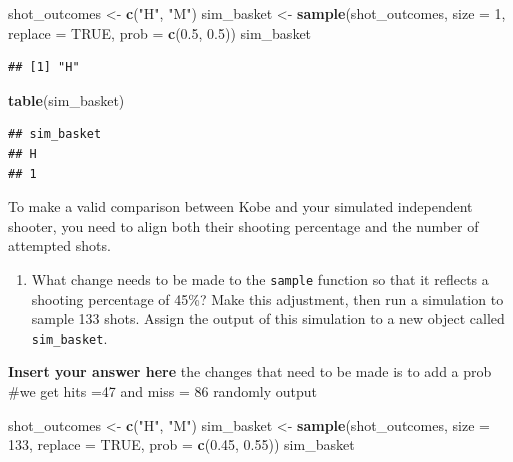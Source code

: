 \documentclass[
]{article}
\newenvironment{Shaded}{\begin{snugshade}}{\end{snugshade}}
\newcommand{\AttributeTok}[1]{\textcolor[rgb]{0.13,0.29,0.53}{#1}}
\newcommand{\ConstantTok}[1]{\textcolor[rgb]{0.56,0.35,0.01}{#1}}
\newcommand{\DecValTok}[1]{\textcolor[rgb]{0.00,0.00,0.81}{#1}}
\newcommand{\FloatTok}[1]{\textcolor[rgb]{0.00,0.00,0.81}{#1}}
\newcommand{\FunctionTok}[1]{\textcolor[rgb]{0.13,0.29,0.53}{\textbf{#1}}}
\newcommand{\NormalTok}[1]{#1}
\newcommand{\OtherTok}[1]{\textcolor[rgb]{0.56,0.35,0.01}{#1}}
\newcommand{\StringTok}[1]{\textcolor[rgb]{0.31,0.60,0.02}{#1}}
\providecommand{\tightlist}{%
  \setlength{\itemsep}{0pt}\setlength{\parskip}{0pt}}
\begin{document}
\begin{Shaded}
\begin{Highlighting}[]
\NormalTok{shot\_outcomes }\OtherTok{\textless{}{-}} \FunctionTok{c}\NormalTok{(}\StringTok{"H"}\NormalTok{, }\StringTok{"M"}\NormalTok{)}
\NormalTok{sim\_basket }\OtherTok{\textless{}{-}} \FunctionTok{sample}\NormalTok{(shot\_outcomes, }\AttributeTok{size =} \DecValTok{1}\NormalTok{, }\AttributeTok{replace =} \ConstantTok{TRUE}\NormalTok{, }\AttributeTok{prob =} \FunctionTok{c}\NormalTok{(}\FloatTok{0.5}\NormalTok{, }\FloatTok{0.5}\NormalTok{))}
\NormalTok{sim\_basket}
\end{Highlighting}
\end{Shaded}

\begin{verbatim}
## [1] "H"
\end{verbatim}

\begin{Shaded}
\begin{Highlighting}[]
\FunctionTok{table}\NormalTok{(sim\_basket)}
\end{Highlighting}
\end{Shaded}

\begin{verbatim}
## sim_basket
## H 
## 1
\end{verbatim}

To make a valid comparison between Kobe and your simulated independent
shooter, you need to align both their shooting percentage and the number
of attempted shots.

\begin{enumerate}
\def\labelenumi{\arabic{enumi}.}
\setcounter{enumi}{3}
\tightlist
\item
  What change needs to be made to the \texttt{sample} function so that
  it reflects a shooting percentage of 45\%? Make this adjustment, then
  run a simulation to sample 133 shots. Assign the output of this
  simulation to a new object called \texttt{sim\_basket}.
\end{enumerate}

\textbf{Insert your answer here} the changes that need to be made is to
add a prob \#we get hits =47 and miss = 86 randomly output

\begin{Shaded}
\begin{Highlighting}[]
\NormalTok{shot\_outcomes }\OtherTok{\textless{}{-}} \FunctionTok{c}\NormalTok{(}\StringTok{"H"}\NormalTok{, }\StringTok{"M"}\NormalTok{)}
\NormalTok{sim\_basket }\OtherTok{\textless{}{-}} \FunctionTok{sample}\NormalTok{(shot\_outcomes, }\AttributeTok{size =}  \DecValTok{133}\NormalTok{, }\AttributeTok{replace =} \ConstantTok{TRUE}\NormalTok{, }\AttributeTok{prob =} \FunctionTok{c}\NormalTok{(}\FloatTok{0.45}\NormalTok{, }\FloatTok{0.55}\NormalTok{))}
\NormalTok{sim\_basket}
\end{Highlighting}
\end{Shaded}
\end{document}
